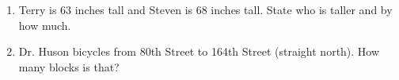 \begin{enumerate}
\item Terry is 63 inches tall and Steven is 68 inches tall. State who is taller and by how much. \vspace{3cm}

\item Dr. Huson bicycles from 80th Street to 164th Street (straight north). How many blocks is that?

\end{enumerate}
